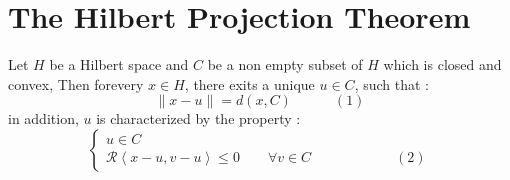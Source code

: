 % 
% 
% 
\lecday[2025-05-27]

% 

\section{The Hilbert Projection Theorem}

\begin{theorem}[(Hilbert)]
  Let $H $ be a Hilbert space and $C $ be
  a non empty subset of $H $ which is closed and 
  convex, Then forevery $x \in  H $, there exits
  a unique $u \in  C $, such that : 
  \[
  \| x-u \| =
  d(x,C) \quad \quad \quad (1) 
  \]
  in addition, $u $ is characterized by 
  the property : 
  \[
    \begin{cases}
       u \in  C  \\
      \mathcal{R} \left\langle x-u, v-u \right\rangle  
      \leq  0 \quad \quad  \forall  v \in  C \quad 
      \quad \quad \quad \quad \quad 
      (2) 
    \end{cases}
  \]
\end{theorem}

